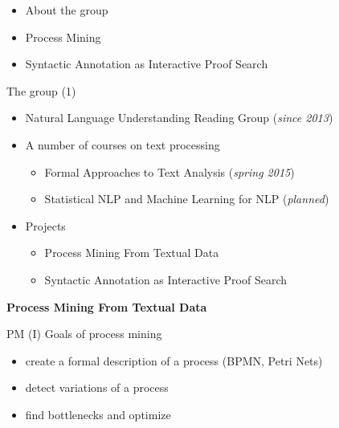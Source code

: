\documentclass{beamer}
\begin{document}
\begin{frame}{}
    \setcounter{framenumber}{1}
    \begin{itemize}
        \item About the group
        \item Process Mining
        \item Syntactic Annotation as Interactive Proof Search
    \end{itemize}
\end{frame}

\begin{frame}{The group (1)}
\begin{itemize}
    \item Natural Language Understanding Reading Group (\textit{since 2013})
    \item A number of courses on text processing
        \begin{itemize}
            \item Formal Approaches to Text Analysis (\textit{spring 2015})
            \item Statistical NLP and Machine Learning for NLP (\textit{planned})
        \end{itemize}
    \item Projects
        \begin{itemize}
            \item Process Mining From Textual Data
            \item Syntactic Annotation as Interactive Proof Search
        \end{itemize}
\end{itemize}
\end{frame}

\begin{frame}{}
\begin{center}
	\textbf{Process Mining From Textual Data}
\end{center}
\end{frame}

\begin{frame}{PM (I)}
Goals of process mining\\
\bigskip
\begin{itemize}
    \item create a formal description of a process (BPMN, Petri Nets)
    \item detect variations of a process
    \item find bottlenecks and optimize
\end{itemize}
\end{frame}
\end{document}
